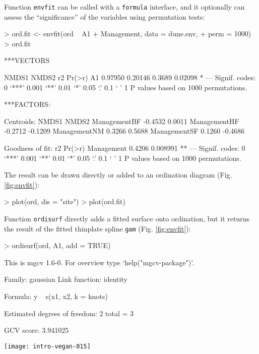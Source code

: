 \documentclass[a4paper,10pt]{amsart}
\begin{document}
Function \texttt{envfit} can be called with a \texttt{formula}
interface, and it optionally can assess the ``significance'' of the
variables using permutation tests:
\begin{Schunk}
\begin{Sinput}
> ord.fit <- envfit(ord ~ A1 + Management, data = dune.env, 
+     perm = 1000)
> ord.fit
\end{Sinput}
\begin{Soutput}
***VECTORS

     NMDS1   NMDS2     r2  Pr(>r)  
A1 0.97950 0.20146 0.3689 0.02098 *
---
Signif. codes:  0 ‘***’ 0.001 ‘**’ 0.01 ‘*’ 0.05 ‘.’ 0.1 ‘ ’ 1 
P values based on 1000 permutations.

***FACTORS:

Centroids:
               NMDS1   NMDS2
ManagementBF -0.4532  0.0011
ManagementHF -0.2712 -0.1209
ManagementNM  0.3266  0.5688
ManagementSF  0.1260 -0.4686

Goodness of fit:
               r2   Pr(>r)   
Management 0.4206 0.008991 **
---
Signif. codes:  0 ‘***’ 0.001 ‘**’ 0.01 ‘*’ 0.05 ‘.’ 0.1 ‘ ’ 1 
P values based on 1000 permutations.
\end{Soutput}
\end{Schunk}
The result can be drawn directly or added to an ordination diagram
(Fig. \ref{fig:envfit}):
\begin{Schunk}
\begin{Sinput}
> plot(ord, dis = "site")
> plot(ord.fit)
\end{Sinput}
\end{Schunk}

Function \texttt{ordisurf} directly adds a fitted surface onto
ordination, but it returns the result of the fitted thinplate spline
\texttt{gam} (Fig. \ref{fig:envfit}):
\begin{Schunk}
\begin{Sinput}
> ordisurf(ord, A1, add = TRUE)
\end{Sinput}
\begin{Soutput}
This is mgcv 1.6-0. For overview type `help("mgcv-package")'.

Family: gaussian 
Link function: identity 

Formula:
y ~ s(x1, x2, k = knots)

Estimated degrees of freedom:
2  total = 3 

GCV score: 3.941025
\end{Soutput}
\end{Schunk}
\begin{SCfigure}
\texttt{[image: intro-vegan-015]}
\caption{Fitted vector and smooth surface for the thickness of A1
  horizon (\texttt{A1}, in cm), and centroids of Management levels.}
\label{fig:envfit}
\end{SCfigure}
\end{document}
